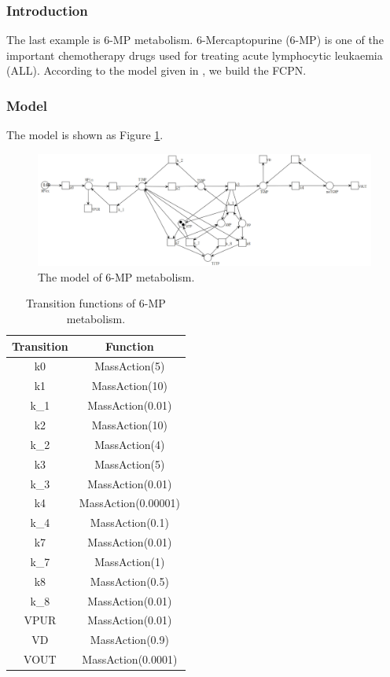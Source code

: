 \documentclass[journal,a4paper,onecolumn]{article}
\begin{document}
\subsubsection{Introduction}
The last example is 6-MP metabolism. 6-Mercaptopurine (6-MP) is one of the important chemotherapy drugs used for treating acute lymphocytic leukaemia (ALL). According to the model given in \cite{lavrova2017ordinary}\cite{lavrova2016ode}, we build the FCPN.
\subsubsection{Model}
The model is shown as Figure \ref{fig:The model of 6-MP metabolism}.
\begin{figure}[!hbt]
	\begin{center}
		\includegraphics[width=\columnwidth]{fig53}
		\caption{The model of 6-MP metabolism.}
		\label{fig:The model of 6-MP metabolism}
	\end{center}
\end{figure}
\begin{table}[!hbt]
	\begin{center}
		\caption{Transition functions of 6-MP metabolism.}
		\label{Transition functions of 6-MP metabolism}
		\begin{tabular}{|c|c|}
			\hline
			Transition&Function\\
			\hline
			k0&MassAction(5)\\
			\hline
			k1&MassAction(10)\\
			\hline
			k\_1&MassAction(0.01)\\
			\hline
			k2&MassAction(10)\\
			\hline
			k\_2&MassAction(4)\\
			\hline
			k3&MassAction(5)\\
			\hline
			k\_3&MassAction(0.01)\\
			\hline
			k4&MassAction(0.00001)\\
			\hline
			k\_4&MassAction(0.1)\\
			\hline
			k7&MassAction(0.01)\\
			\hline
			k\_7&MassAction(1)\\
			\hline
			k8&MassAction(0.5)\\
			\hline
			k\_8&MassAction(0.01)\\
			\hline
			VPUR&MassAction(0.01)\\
			\hline
			VD&MassAction(0.9)\\
			\hline
			VOUT&MassAction(0.0001)\\
			\hline
		\end{tabular}
	\end{center}
\end{table}
\end{document}
